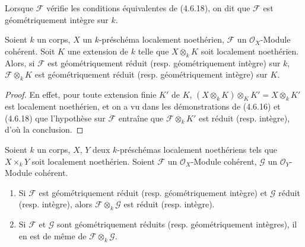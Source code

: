 \begin{definition}[4.6.19]
\label{IV.2.4.6.19-fr}
Lorsque $\mathscr F$ vérifie les conditions équivalentes de \textup{(4.6.18)}, on dit
que $\mathscr F$ est géométriquement intègre sur $k$.
\end{definition}

\begin{proposition}[4.6.20]
\label{IV.2.4.6.20-fr}
Soient $k$ un corps, $X$ un $k$-préschéma localement noethérien, $\mathscr F$
un $\mathcal O_X$-Module cohérent. Soit $K$ une extension de $k$ telle que
$X\otimes_k K$ soit localement noethérien. Alors, si $\mathscr F$ est
géométriquement réduit \textup{(resp.} géométriquement intègre) sur $k$,
$\mathscr F\otimes_k K$ est géométriquement réduit \textup{(resp.} géométriquement
intègre) sur $K$.
\end{proposition}

\begin{proof}
En effet, pour toute extension finie $K'$ de $K$,
$(X\otimes_k K)\otimes_K K'=X\otimes_k K'$
est localement noethérien, et on a vu dans les démonstrations de (4.6.16) et
(4.6.18) que l'hypothèse sur $\mathscr F$ entraîne que
$\mathscr F\otimes_k K'$ est réduit (resp. intègre), d'où la conclusion.
\end{proof}

\begin{proposition}[4.6.21]
\label{IV.2.4.6.21-fr}
Soient $k$ un corps, $X$, $Y$ deux $k$-préschémas localement noethériens tels
que $X\times_k Y$ soit localement noethérien. Soient $\mathscr F$ un
$\mathcal O_X$-Module cohérent, $\mathscr G$ un $\mathcal O_Y$-Module cohérent.
\begin{enumerate}
\item[\textup{(i)}] Si $\mathscr F$ est géométriquement réduit \textup{(resp.} géométriquement
intègre) et $\mathscr G$ réduit \textup{(resp.} intègre), alors
$\mathscr F\otimes_k\mathscr G$ est réduit \textup{(resp.} intègre).
\item[\textup{(ii)}] Si $\mathscr F$ et $\mathscr G$ sont géométriquement réduits \textup{(resp.}
géométriquement intègres), il en est de même de
$\mathscr F\otimes_k\mathscr G$.
\end{enumerate}
\end{proposition}

